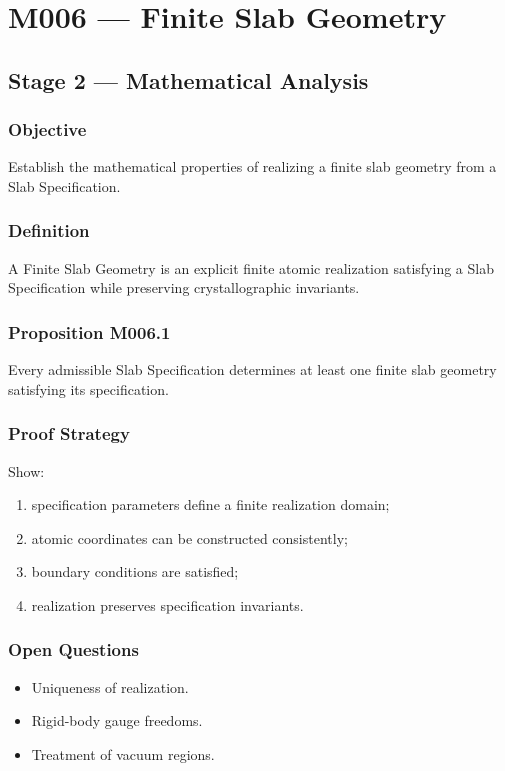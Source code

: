 \chapter{M006 --- Finite Slab Geometry}

\section{Stage 2 --- Mathematical Analysis}

\subsection{Objective}

Establish the mathematical properties of realizing a finite slab geometry
from a Slab Specification.

\subsection{Definition}

A Finite Slab Geometry is an explicit finite atomic realization satisfying
a Slab Specification while preserving crystallographic invariants.

\subsection{Proposition M006.1}

Every admissible Slab Specification determines at least one finite slab
geometry satisfying its specification.

\subsection{Proof Strategy}

Show:
\begin{enumerate}
\item specification parameters define a finite realization domain;
\item atomic coordinates can be constructed consistently;
\item boundary conditions are satisfied;
\item realization preserves specification invariants.
\end{enumerate}

\subsection{Open Questions}

\begin{itemize}
\item Uniqueness of realization.
\item Rigid-body gauge freedoms.
\item Treatment of vacuum regions.
\end{itemize}
